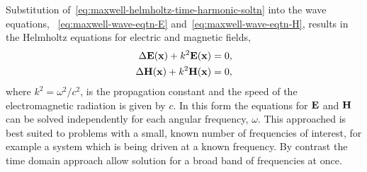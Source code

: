 Substitution of~\eqref{eq:maxwell-helmholtz-time-harmonic-soltn} into the wave equations, ~\eqref{eq:maxwell-wave-eqtn-E} and~\eqref{eq:maxwell-wave-eqtn-H}, results in the Helmholtz equations for electric and magnetic fields,
\begin{align}
  \label{eq:helmholtz}
  \Delta \mathbf{E}(\mathbf{x}) + k^2 \mathbf{E}(\mathbf{x}) = 0, \\
  \Delta \mathbf{H}(\mathbf{x}) + k^2 \mathbf{H}(\mathbf{x}) = 0,
\end{align}
where $k^2 =\omega^2/c^2$, is the propagation constant and the speed of the electromagnetic radiation is given by $c$. In this form the equations for $\mathbf{E}$ and $\mathbf{H}$ can be solved independently for each angular frequency, $\omega$. This approached is best suited to problems with a small, known number of frequencies of interest, for example a system which is being driven at a known frequency. By contrast the time domain approach allow solution for a broad band of frequencies at once.




